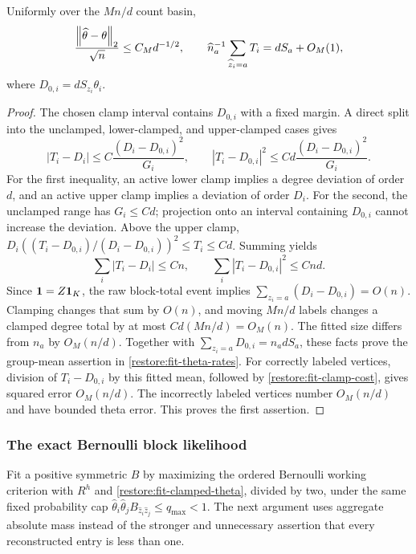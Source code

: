 \begin{lemma}
\label{restore:fit-theta}
Uniformly over the $Mn/d$ count basin,
\begin{equation}\label{restore:fit-theta-rates}
 \frac{\left\lVert\widehat\theta-\theta\right\rVert_2}{\sqrt n}
        \le C_Md^{-1/2},\qquad
 \widehat n_a^{-1}\sum_{\widehat z_i=a}T_i
        =dS_a+O_M(1),
\end{equation}
where $D_{0,i}=dS_{z_i}\theta_i$.
\end{lemma}

\begin{proof}
The chosen clamp interval contains $D_{0,i}$ with a fixed margin.
A direct split into the unclamped, lower-clamped, and upper-clamped
cases gives
\[
 |T_i-D_i|\le C\frac{(D_i-D_{0,i})^2}{G_i},\qquad
 |T_i-D_{0,i}|^2\le Cd\frac{(D_i-D_{0,i})^2}{G_i}.
\]
For the first inequality, an active lower clamp implies a degree
deviation of order $d$, and an active upper clamp implies a deviation
of order $D_i$. For the second, the unclamped range has $G_i\le Cd$;
projection onto an interval containing $D_{0,i}$ cannot increase
the deviation. Above the upper clamp,
$D_i((T_i-D_{0,i})/(D_i-D_{0,i}))^2\le T_i\le Cd$.
Summing yields
\begin{equation}\label{restore:fit-clamp-cost}
 \sum_i|T_i-D_i|\le Cn,\qquad
 \sum_i|T_i-D_{0,i}|^2\le Cnd.
\end{equation}
Since $\mathbf 1=Z\mathbf 1_K$, the raw block-total event implies
$\sum_{z_i=a}(D_i-D_{0,i})=O(n)$.
Clamping changes that sum by $O(n)$, and moving $Mn/d$ labels changes
a clamped degree total by at most $Cd(Mn/d)=O_M(n)$.
The fitted size differs from $n_a$ by $O_M(n/d)$.
Together with $\sum_{z_i=a}D_{0,i}=n_adS_a$, these facts prove the
group-mean assertion in \eqref{restore:fit-theta-rates}.
For correctly labeled vertices, division of
$T_i-D_{0,i}$ by this fitted mean, followed by
\eqref{restore:fit-clamp-cost}, gives squared error $O_M(n/d)$.
The incorrectly labeled vertices number $O_M(n/d)$ and have bounded
theta error. This proves the first assertion.
\end{proof}

\subsubsection{The exact Bernoulli block likelihood}

Fit a positive symmetric $B$ by maximizing the ordered Bernoulli
working criterion with $R^h$ and \eqref{restore:fit-clamped-theta},
divided by two, under the same fixed probability cap
$\widehat\theta_i\widehat\theta_jB_{\widehat z_i\widehat z_j}
\le q_{\max}<1$.
The next argument uses aggregate absolute mass instead of the stronger
and unnecessary assertion that every reconstructed entry is less than one.

